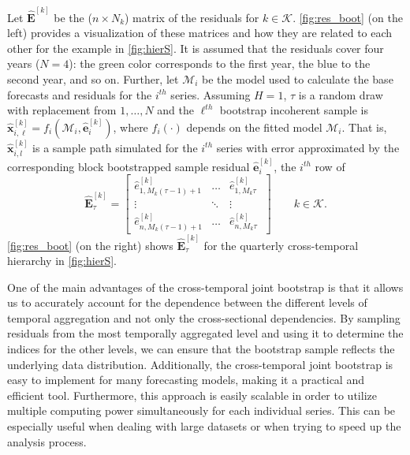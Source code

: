 \documentclass[a4paper,11pt]{article}
\newcommand{\evet}{\bm{e}}
\newcommand{\xvet}{\bm{x}}
\newcommand{\Evet}{\bm{E}}
\theoremstyle{definition}
\begin{document}
Let $\widehat{\Evet}^{[k]}$ be the ($n \times N_k$) matrix of the residuals for $k \in \mathcal{K}$. \autoref{fig:res_boot} (on the left) provides a visualization of these matrices and how they are related to each other for the example in \autoref{fig:hierS}. It is assumed that the residuals cover four years ($N=4$): the green color corresponds to the first year, the blue to the second year, and so on. Further, let $\mathcal{M}_i$ be the model used to calculate the base forecasts and residuals for the $i^{th}$ series. %
Assuming $H = 1$, $\tau$ is a random draw with replacement from $1,\dots, N$ and the $\ell^{th}$ bootstrap incoherent sample is
$\widehat{\xvet}_{i,\ell}^{[k]} = f_i(\mathcal{M}_i, \widehat{\evet}_{i}^{[k]})$,
where $f_i(\cdot)$ depends on the fitted %
model $\mathcal{M}_i$. That is, $\widehat{\xvet}_{i,l}^{[k]}$ is a sample path simulated for the $i^{th}$ series with error approximated by the corresponding block bootstrapped sample residual $\widehat{\evet}_{i}^{[k]}$, the $i^{th}$ row of
$$
	\widehat{\Evet}^{[k]}_{\tau} = \begin{bmatrix}
		\widehat{e}^{[k]}_{1,M_k(\tau-1)+1} & \dots  & \widehat{e}^{[k]}_{1,M_k\tau}   \\
		\vdots                              & \ddots & \vdots                          \\
		\widehat{e}^{[k]}_{n,M_k(\tau-1)+1} & \dots  & \widehat{e}^{[k]}_{n,M_k\tau} \
	\end{bmatrix}\qquad k \in \mathcal{K}.
$$
\autoref{fig:res_boot} (on the right) shows $\widehat{\Evet}^{[k]}_{\tau}$ for the quarterly cross-temporal hierarchy in \autoref{fig:hierS}.



One of the main advantages of the cross-temporal joint bootstrap is that it allows us to accurately account for the dependence between the different levels of temporal aggregation and not only the cross-sectional dependencies. By sampling residuals from the most temporally aggregated level and using it to determine the indices for the other levels, we can ensure that the bootstrap sample reflects the underlying data distribution. Additionally, the cross-temporal joint bootstrap is easy to implement %
for many forecasting models, making it a practical and efficient tool. Furthermore, this approach is easily scalable in order to utilize multiple computing power simultaneously for each individual series. This can be especially useful when dealing with large datasets or when trying to speed up the analysis process.
\end{document}
